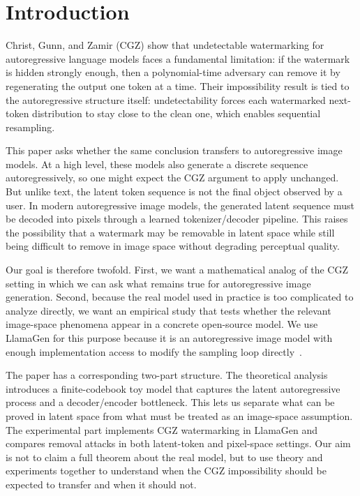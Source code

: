 \documentclass[12pt]{article}
\begin{document}
\maketitleblock

\begin{abstract}
[TBD]
\end{abstract}

\section{Introduction}

Christ, Gunn, and Zamir (CGZ) show that undetectable watermarking for
autoregressive language models faces a fundamental limitation: if the
watermark is hidden strongly enough, then a polynomial-time adversary
can remove it by regenerating the output one token at a time. Their
impossibility result is tied to the autoregressive structure itself:
undetectability forces each watermarked next-token distribution to stay
close to the clean one, which enables sequential resampling.

This paper asks whether the same conclusion transfers to autoregressive
image models. At a high level, these models also generate a discrete
sequence autoregressively, so one might expect the CGZ argument to
apply unchanged. But unlike text, the latent token sequence is not the
final object observed by a user. In modern autoregressive image models,
the generated latent sequence must be decoded into pixels through a
learned tokenizer/decoder pipeline. This raises the possibility that a
watermark may be removable in latent space while still being difficult
to remove in image space without degrading perceptual quality.

Our goal is therefore twofold. First, we want a mathematical analog of
the CGZ setting in which we can ask what remains true for
autoregressive image generation. Second, because the real model used in
practice is too complicated to analyze directly, we want an empirical
study that tests whether the relevant image-space phenomena appear in a
concrete open-source model. We use LlamaGen for this purpose because it
is an autoregressive image model with enough implementation access to
modify the sampling loop directly~\cite{llamagen2024}.

The paper has a corresponding two-part structure. The theoretical
analysis introduces a finite-codebook toy model that captures the
latent autoregressive process and a decoder/encoder bottleneck. This
lets us separate what can be proved in latent space from what must be
treated as an image-space assumption. The experimental part implements
CGZ watermarking in LlamaGen and compares removal attacks in both
latent-token and pixel-space settings. Our aim is not to claim a full
theorem about the real model, but to use theory and experiments
together to understand when the CGZ impossibility should be expected to
transfer and when it should not.
\end{document}
